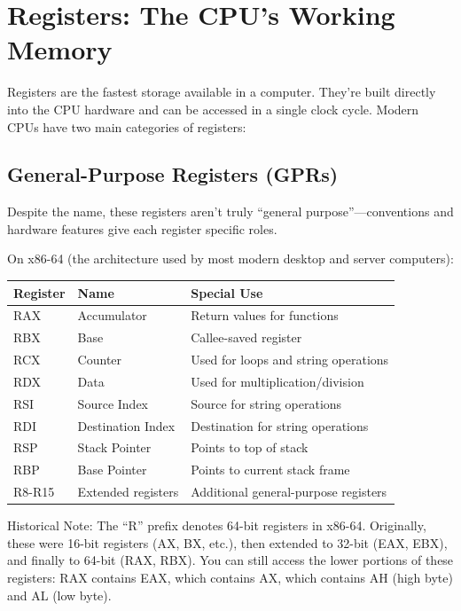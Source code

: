 \section{Registers: The CPU's Working Memory}

Registers are the fastest storage available in a computer. They're built directly into the CPU hardware and can be accessed in a single clock cycle. Modern CPUs have two main categories of registers:

\subsection{General-Purpose Registers (GPRs)}

Despite the name, these registers aren't truly ``general purpose''---conventions and hardware features give each register specific roles.

On x86-64 (the architecture used by most modern desktop and server computers):

\begin{center}
\begin{tabular}{|l|l|l|}
\hline
\textbf{Register} & \textbf{Name} & \textbf{Special Use} \\ \hline
RAX & Accumulator & Return values for functions \\ \hline
RBX & Base & Callee-saved register \\ \hline
RCX & Counter & Used for loops and string operations \\ \hline
RDX & Data & Used for multiplication/division \\ \hline
RSI & Source Index & Source for string operations \\ \hline
RDI & Destination Index & Destination for string operations \\ \hline
RSP & Stack Pointer & Points to top of stack \\ \hline
RBP & Base Pointer & Points to current stack frame \\ \hline
R8-R15 & Extended registers & Additional general-purpose registers \\ \hline
\end{tabular}
\end{center}

\begin{warning}
  Historical Note: The ``R'' prefix denotes 64-bit registers in x86-64. Originally, these were 16-bit registers (AX, BX, etc.), then extended to 32-bit (EAX, EBX), and finally to 64-bit (RAX, RBX). You can still access the lower portions of these registers: RAX contains EAX, which contains AX, which contains AH (high byte) and AL (low byte).
\end{warning}

